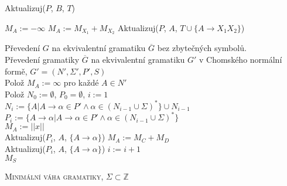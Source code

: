 \documentclass[a4paper,12pt]{article}
\begin{document}
\begin{enumerate}[label=\textbf{\arabic*}.]
\begin{enumerate}
  \enlargethispage{1em}
   \begin{procedure}[H]
  \caption{Aktualizuj($P$, $B$, $T$)}
 \SetNlSty{}{}{:}
 \SetNlSkip{-1.0em}
 \SetInd{0.5em}{0.5em}
 \Indentp{1.4em}
    {
      {
	{
	  $M_A := -\infty$
	}
	\Else
	{
	  $M_A := M_{X_1} + M_{X_2} $
	}
	Aktualizuj($P$, $A$, $T\cup \{A \rightarrow X_1X_2\}$)
      }
    }
\end{procedure}

    \begin{algorithm}[H]
 \SetNlSty{}{}{:}
 \SetNlSkip{-1.0em}
 \SetInd{0.5em}{0.5em}
 \BlankLine
 \Indentp{1.4em}
    Převedení $G$ na ekvivalentní gramatiku $\overline{G}$ bez zbytečných symbolů.\\
    Převedení gramatiky $\overline{G}$ na ekvivalentní gramatiku $G'$ v Chomského normální formě, $G' = (N', \Sigma', P', S)$\\
    Polož $M_A := \infty$ pro každé $A \in N'$\\
    Polož $N_0 := \emptyset$, $P_0 = \emptyset$, $i := 1$\\
    {
      $N_i := \{A| A\rightarrow \alpha \in P' \wedge \alpha\in(N_{i-1} \cup \Sigma)^*\} \cup N_{i-1}$\\
      $P_i := \{A \rightarrow \alpha | A \rightarrow \alpha \in P' \wedge \alpha\in(N_{i-1} \cup \Sigma)^*\}$\\
      {
	{
	  $M_A := ||x||$\\
	  Aktualizuj($P_i$, $A$, $\{A \rightarrow \alpha\}$)
	}
	{
	  $M_A := M_C + M_D$\\
	  Aktualizuj($P_i$, $A$, $\{A \rightarrow \alpha\}$)
	}
      }
      $i := i + 1$\\
    }
    \Return $M_S$
 \caption{\textsc{Minimální váha gramatiky, $\Sigma \subset \mathbb{Z}$}}
 \end{algorithm}
 \end{enumerate}


\end{enumerate}
\end{document}
